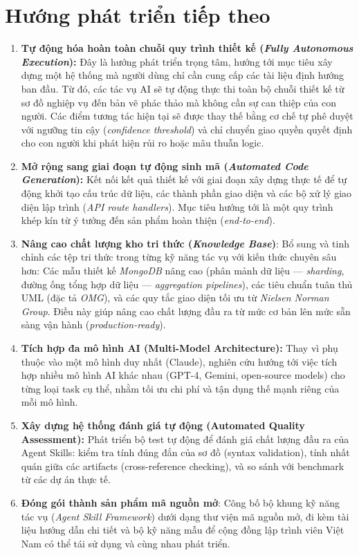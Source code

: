 \documentclass[13pt,a4paper,oneside]{extreport}
\numberwithin{equation}{chapter}
\numberwithin{figure}{chapter}
\numberwithin{table}{chapter}
\begin{document}
\section*{Hướng phát triển tiếp theo}

\begin{enumerate}
    \item \textbf{Tự động hóa hoàn toàn chuỗi quy trình thiết kế (\textit{Fully Autonomous Execution}):} Đây là hướng phát triển trọng tâm, hướng tới mục tiêu xây dựng một hệ thống mà người dùng chỉ cần cung cấp các tài liệu định hướng ban đầu. Từ đó, các tác vụ AI sẽ tự động thực thi toàn bộ chuỗi thiết kế từ sơ đồ nghiệp vụ đến bản vẽ phác thảo mà không cần sự can thiệp của con người. Các điểm tương tác hiện tại sẽ được thay thế bằng cơ chế tự phê duyệt với ngưỡng tin cậy (\textit{confidence threshold}) và chỉ chuyển giao quyền quyết định cho con người khi phát hiện rủi ro hoặc mâu thuẫn logic.

    \item \textbf{Mở rộng sang giai đoạn tự động sinh mã (\textit{Automated Code Generation}):} Kết nối kết quả thiết kế với giai đoạn xây dựng thực tế để tự động khởi tạo cấu trúc dữ liệu, các thành phần giao diện và các bộ xử lý giao diện lập trình (\textit{API route handlers}). Mục tiêu hướng tới là một quy trình khép kín từ ý tưởng đến sản phẩm hoàn thiện (\textit{end-to-end}).

    \item \textbf{Nâng cao chất lượng kho tri thức (\textit{Knowledge Base})}: Bổ sung và tinh chỉnh các tệp tri thức trong từng kỹ năng tác vụ với kiến thức chuyên sâu hơn: Các mẫu thiết kế \textit{MongoDB} nâng cao (phân mảnh dữ liệu — \textit{sharding}, đường ống tổng hợp dữ liệu — \textit{aggregation pipelines}), các tiêu chuẩn tuân thủ UML (đặc tả \textit{OMG}), và các quy tắc giao diện tối ưu từ \textit{Nielsen Norman Group}. Điều này giúp nâng cao chất lượng đầu ra từ mức cơ bản lên mức sẵn sàng vận hành (\textit{production-ready}).
    \item \textbf{Tích hợp đa mô hình AI (Multi-Model Architecture):} Thay vì phụ thuộc vào một mô hình duy nhất (Claude), nghiên cứu hướng tới việc tích hợp nhiều mô hình AI khác nhau (GPT-4, Gemini, open-source models) cho từng loại task cụ thể, nhằm tối ưu chi phí và tận dụng thế mạnh riêng của mỗi mô hình.

    \item \textbf{Xây dựng hệ thống đánh giá tự động (Automated Quality Assessment):} Phát triển bộ test tự động để đánh giá chất lượng đầu ra của Agent Skills: kiểm tra tính đúng đắn của sơ đồ (syntax validation), tính nhất quán giữa các artifacts (cross-reference checking), và so sánh với benchmark từ các dự án thực tế.

    \item \textbf{Đóng gói thành sản phẩm mã nguồn mở}: Công bố bộ khung kỹ năng tác vụ (\textit{Agent Skill Framework}) dưới dạng thư viện mã nguồn mở, đi kèm tài liệu hướng dẫn chi tiết và bộ kỹ năng mẫu để cộng đồng lập trình viên Việt Nam có thể tái sử dụng và cùng nhau phát triển.
\end{enumerate}
\end{document}
